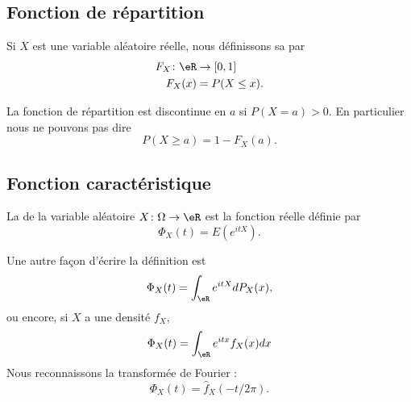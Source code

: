 
\subsection{Fonction de répartition}

\begin{definition}      \label{DefooYAZVooNdxDCx}
	Si \( X\) est une variable aléatoire réelle, nous définissons sa  par
	\begin{equation}
		\begin{aligned}
			F_X\colon \eR & \to \mathopen[ 0 , 1 \mathclose] \\
			F_X(x)        & =P(X\leq x).
		\end{aligned}
	\end{equation}
\end{definition}

\begin{remark}
	La fonction de répartition est discontinue en \( a\) si \( P(X=a)>0\). En particulier nous ne pouvons pas dire
	\begin{equation}
		P(X\geq a)=1-F_X(a).
	\end{equation}
\end{remark}

\subsection{Fonction caractéristique}

\begin{definition}      \label{DefooEIVXooNtHLQQ}
	La  de la variable aléatoire \( X\colon \Omega\to \eR\) est la fonction réelle définie par
	\begin{equation}
		\Phi_X(t)=E( e^{itX}).
	\end{equation}
\end{definition}
Une autre façon d'écrire la définition est
\begin{equation}
	\Phi_X(t)=\int_{\eR} e^{itX}dP_X(x),
\end{equation}
ou encore, si \( X\) a une densité \( f_X\),
\begin{equation}        \label{EqFnCaractfncadens}
	\Phi_X(t)=\int_{\eR} e^{itx}f_X(x)dx
\end{equation}
Nous reconnaissons la transformée de Fourier :
\begin{equation}
	\Phi_X(t)=\hat f_X(-t/2\pi).
\end{equation}

